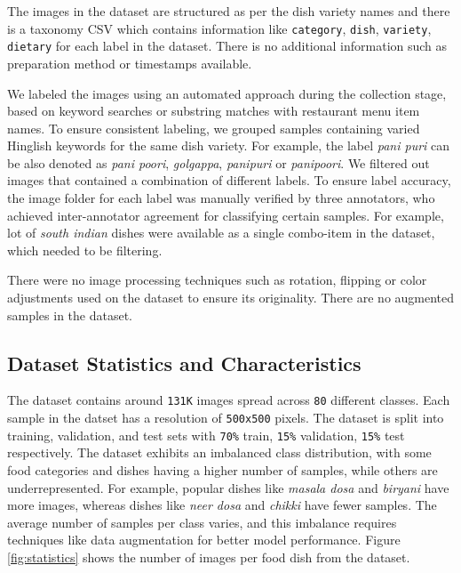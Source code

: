 \documentclass{article}
\begin{document}
The images in the dataset are structured as per the dish variety names and there is a taxonomy CSV which contains information like \texttt{category}, \texttt{dish}, \texttt{variety}, \texttt{dietary} for each label in the dataset. There is no additional information such as preparation method or timestamps available.
 
We labeled the images using an automated approach during the collection stage, based on keyword searches or substring matches with restaurant menu item names. To ensure consistent labeling, we grouped samples containing varied Hinglish keywords for the same dish variety. For example, the label \textit{pani puri} can be also denoted as \textit{pani poori}, \textit{golgappa}, \textit{panipuri} or \textit{panipoori}. We filtered out images that contained a combination of different labels. To ensure label accuracy, the image folder for each label was manually verified by three annotators, who achieved inter-annotator agreement for classifying certain samples. For example, lot of \textit{south indian} dishes were available as a single combo-item in the dataset, which needed to be filtering.

There were no image processing techniques such as rotation, flipping or color adjustments used on the dataset to ensure its originality. There are no augmented samples in the dataset.

\subsection{Dataset Statistics and Characteristics}
\label{subsec:data-stats}

The dataset contains around \texttt{131K} images spread across \texttt{80} different classes. Each sample in the datset has a resolution of \texttt{500x500} pixels. The dataset is split into training, validation, and test sets with \texttt{70\%} train, \texttt{15\%} validation, \texttt{15\%} test respectively. The dataset exhibits an imbalanced class distribution, with some food categories and dishes having a higher number of samples, while others are underrepresented. For example, popular dishes like \textit{masala dosa} and \textit{biryani} have more images, whereas dishes like \textit{neer dosa} and \textit{chikki} have fewer samples. The average number of samples per class varies, and this imbalance requires techniques like data augmentation for better model performance. Figure \ref{fig:statistics} shows the number of images per food dish from the dataset.
\end{document}
